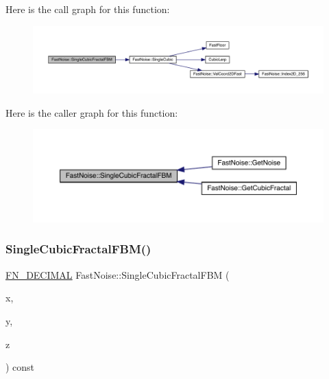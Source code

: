 Here is the call graph for this function\+:
\nopagebreak
\begin{figure}[H]
\begin{center}
\leavevmode
\includegraphics[width=350pt]{d1/dd8/class_fast_noise_a892cdc836d7704acfbf8c3680a1a2689_cgraph}
\end{center}
\end{figure}
Here is the caller graph for this function\+:
\nopagebreak
\begin{figure}[H]
\begin{center}
\leavevmode
\includegraphics[width=350pt]{d1/dd8/class_fast_noise_a892cdc836d7704acfbf8c3680a1a2689_icgraph}
\end{center}
\end{figure}
\mbox{\label{class_fast_noise_a6334e559478fb891e31e305d64c0c31d}} 
\subsubsection{\texorpdfstring{Single\+Cubic\+Fractal\+F\+B\+M()}{SingleCubicFractalFBM()}\hspace{0.1cm}{\footnotesize\ttfamily [2/2]}}
{\footnotesize\ttfamily \mbox{\hyperlink{_fast_noise_8h_a75a9ef6d2541c4921815b885bfd449c3}{F\+N\+\_\+\+D\+E\+C\+I\+M\+AL}} Fast\+Noise\+::\+Single\+Cubic\+Fractal\+F\+BM (\begin{DoxyParamCaption}\item[{\mbox{\hyperlink{_fast_noise_8h_a75a9ef6d2541c4921815b885bfd449c3}{F\+N\+\_\+\+D\+E\+C\+I\+M\+AL}}}]{x,  }\item[{\mbox{\hyperlink{_fast_noise_8h_a75a9ef6d2541c4921815b885bfd449c3}{F\+N\+\_\+\+D\+E\+C\+I\+M\+AL}}}]{y,  }\item[{\mbox{\hyperlink{_fast_noise_8h_a75a9ef6d2541c4921815b885bfd449c3}{F\+N\+\_\+\+D\+E\+C\+I\+M\+AL}}}]{z }\end{DoxyParamCaption}) const\hspace{0.3cm}{\ttfamily [private]}}

